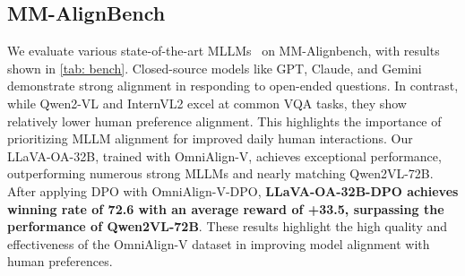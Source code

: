 


\subsection{MM-AlignBench}
We evaluate various state-of-the-art MLLMs~\cite{2022chatgpt,team2023gemini,Claude3,bai2023qwen,chen2024far,li2024llava,minicpm2024,internlmxcomposer2,LLaMA32Vision,laurençon2024building,wang2024enhancing} on MM-Alignbench, with results shown in \cref{tab: bench}. 
Closed-source models like GPT, Claude, and Gemini demonstrate strong alignment in responding to open-ended questions. 
In contrast, while Qwen2-VL and InternVL2 excel at common VQA tasks, they show relatively lower human preference alignment. 
This highlights the importance of prioritizing MLLM alignment for improved daily human interactions. 
Our LLaVA-OA-32B, trained with OmniAlign-V, achieves exceptional performance, outperforming numerous strong MLLMs and nearly matching Qwen2VL-72B. 
After applying DPO with OmniAlign-V-DPO, \textbf{LLaVA-OA-32B-DPO achieves winning rate of 72.6 with an average reward of +33.5,  surpassing the performance of Qwen2VL-72B}. 
These results highlight the high quality and effectiveness of the OmniAlign-V dataset in improving model alignment with human preferences.



